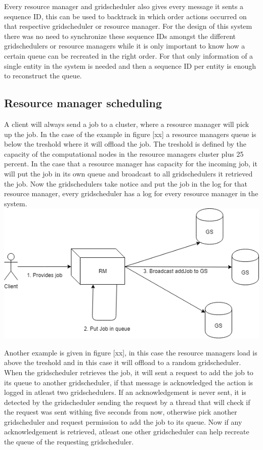 \documentclass[a4paper]{article}
\begin{document}
Every resource manager and gridscheduler also gives every message it sents a sequence ID, this can be used to backtrack in which order actions occurred on that respective gridscheduler or resource manager.
For the design of this system there was no need to synchronize these sequence IDs amongst the different gridschedulers or resource managers while it is only important to know how a certain queue can be recreated in the right order.
For that only information of a single entity in the system is needed and then a sequence ID per entity is enough to reconstruct the queue.

\subsection{Resource manager scheduling}
A client will always send a job to a cluster, where a resource manager will pick up the job. 
In the case of the example in figure [xx] a resource managers queue is below the treshold where it will offload the job.
The treshold is defined by the capacity of the computational nodes in the resource managers cluster plus 25 percent.
In the case that a resource manager has capacity for the incoming job, it will put the job in its own queue and broadcast to all gridschedulers it retrieved the job.
Now the gridschedulers take notice and put the job in the log for that resource manager, every gridscheduler has a log for every resource manager in the system. \\
\includegraphics[scale=0.5]{design-rm-own-queue.png}

Another example is given in figure [xx], in this case the resource managers load is above the treshold and in this case it will offload to a random gridscheduler.
When the gridscheduler retrieves the job, it will sent a request to add the job to its queue to another gridscheduler, if that message is acknowledged the action is logged in atleast two gridschedulers.
If an acknowledgement is never sent, it is detected by the gridscheduler sending the request by a thread that will check if the request was sent withing five seconds from now, otherwise pick another gridscheduler and request permission to add the job to its queue.
Now if any acknowledgement is retrieved, atleast one other gridscheduler can help recreate the queue of the requesting gridscheduler. \\
\end{document}
